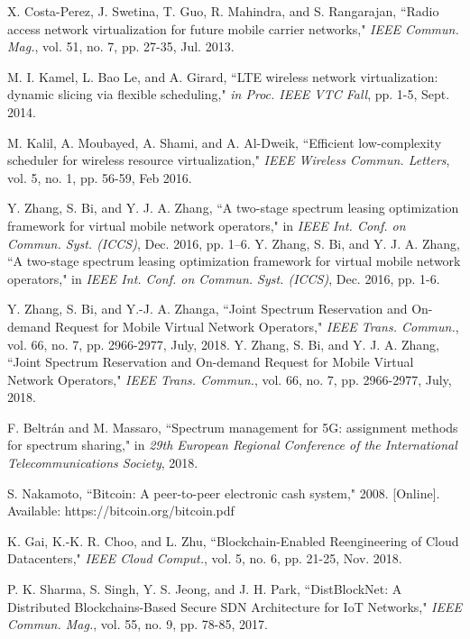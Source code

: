 \documentclass[journal]{IEEEtran}
\begin{document}
\begin{IEEEkeywords}
\begin{thebibliography}{1}
X. Costa-Perez, J. Swetina, T. Guo, R. Mahindra, and S. Rangarajan, ``Radio access network virtualization for future mobile carrier networks," \emph{IEEE Commun. Mag.}, vol. 51, no. 7, pp. 27-35, Jul. 2013.

M. I. Kamel, L. Bao Le, and A. Girard, ``LTE wireless network virtualization: dynamic slicing via flexible scheduling," \emph{in Proc. IEEE VTC Fall}, pp. 1-5, Sept. 2014.

M. Kalil, A. Moubayed, A. Shami, and A. Al-Dweik, ``Efficient low-complexity scheduler for wireless resource virtualization," \emph{IEEE Wireless Commun. Letters}, vol. 5, no. 1, pp. 56-59, Feb 2016.
	
Y. Zhang, S. Bi, and Y. J. A. Zhang, ``A two-stage spectrum leasing optimization framework for virtual mobile network operators," in \emph{IEEE Int. Conf. on Commun. Syst. (ICCS)}, Dec. 2016, pp. 1–6.
Y. Zhang, S. Bi, and Y. J. A. Zhang, ``A two-stage spectrum leasing optimization framework for virtual mobile network operators," in \emph{IEEE Int. Conf. on Commun. Syst. (ICCS)}, Dec. 2016, pp. 1-6.

Y. Zhang, S. Bi, and Y.-J. A. Zhanga, ``Joint Spectrum Reservation and On-demand Request for Mobile Virtual Network Operators," \emph{IEEE Trans. Commun.}, vol. 66, no. 7, pp. 2966-2977, July, 2018.	
Y. Zhang, S. Bi, and Y. J. A. Zhang, ``Joint Spectrum Reservation and On-demand Request for Mobile Virtual Network Operators," \emph{IEEE Trans. Commun.}, vol. 66, no. 7, pp. 2966-2977, July, 2018.	

F. Beltr{\'a}n and M. Massaro, ``Spectrum management for 5G: assignment methods for spectrum sharing," in \emph{29th European Regional Conference of the International Telecommunications Society}, 2018.

S. Nakamoto, ``Bitcoin: A peer-to-peer electronic cash system," 2008. [Online]. Available: https://bitcoin.org/bitcoin.pdf

K. Gai, K.-K. R. Choo, and L. Zhu, ``Blockchain-Enabled Reengineering of Cloud Datacenters," \emph{IEEE Cloud Comput.}, vol. 5, no. 6, pp. 21-25, Nov. 2018.

P. K. Sharma, S. Singh, Y. S. Jeong, and J. H. Park, ``DistBlockNet: A Distributed Blockchains-Based Secure SDN Architecture for IoT Networks," \emph{IEEE Commun. Mag.}, vol. 55, no. 9, pp. 78-85, 2017.


\end{thebibliography}
\end{IEEEkeywords}
\end{document}
